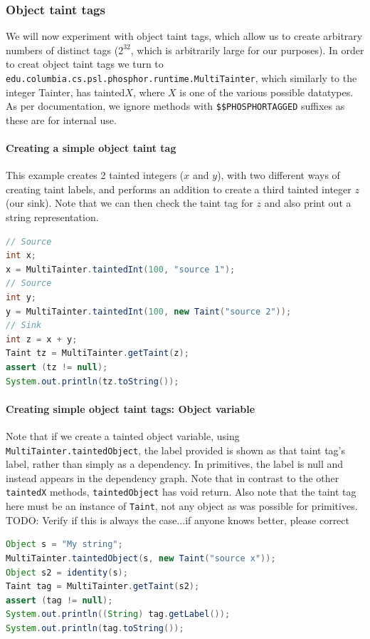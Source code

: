 \documentclass[a4paper]{article}
\newcommand{\todo}[1]{{\color{red}TODO: #1\\}}
\begin{document}
\subsubsection{Object taint tags}
\label{sec:multitaint}
We will now experiment with object taint tags, which allow us to create arbitrary numbers of distinct tags ($2^{32}$, which is arbitrarily large for our purposes). In order to creat object taint tags we turn to 
\verb|edu.columbia.cs.psl.phosphor.runtime.MultiTainter|, which similarly to the integer Tainter, has tainted$X$, where
$X$ is one of the various possible datatypes. As per documentation, we ignore methods
with \verb|$$PHOSPHORTAGGED| suffixes as these are for internal use.

\paragraph{Creating a simple object taint tag}
This example creates 2 tainted integers ($x$ and $y$), with two different ways of creating taint labels, and performs an addition
to create a third tainted integer $z$ (our sink). Note that we can then check the taint tag for $z$ and also print out
a string representation.

\begin{lstlisting}[language=java]
// Source
int x;
x = MultiTainter.taintedInt(100, "source 1");
// Source
int y;
y = MultiTainter.taintedInt(100, new Taint("source 2"));
// Sink
int z = x + y;
Taint tz = MultiTainter.getTaint(z);
assert (tz != null);
System.out.println(tz.toString());
\end{lstlisting}

\paragraph{Creating simple object taint tags: Object variable}
Note that if we create a tainted object variable, using \verb|MultiTainter.taintedObject|, the label provided is
shown as that taint tag's label, rather than simply as a dependency. In primitives, the label is null and instead
appears in the dependency graph. Note that in contrast to the other \verb|taintedX| methods, \verb|taintedObject| has
void return. Also note that the taint tag here must be an instance of \verb|Taint|, not any object as was possible
for primitives.
\todo{Verify if this is always the case...if anyone knows better, please correct}

\begin{lstlisting}[language=java]
Object s = "My string";
MultiTainter.taintedObject(s, new Taint("source x"));
Object s2 = identity(s);
Taint tag = MultiTainter.getTaint(s2);
assert (tag != null);
System.out.println((String) tag.getLabel());
System.out.println(tag.toString());
\end{lstlisting}
\end{document}
